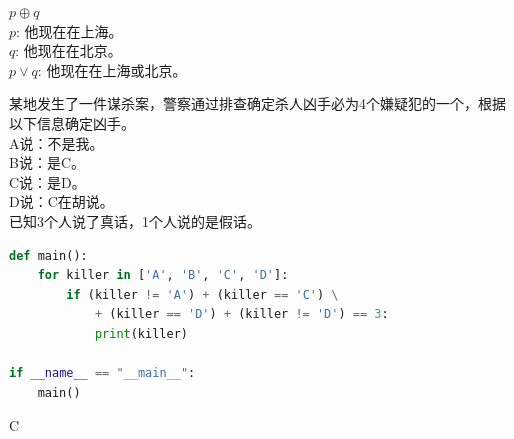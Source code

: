 \documentclass[12pt, openany, oneside]{book}
\begin{document}
\begin{table}[H]
	\centering
	\caption{XOR真值表}
\end{table}

\begin{tcolorbox}
	$ p \oplus q $ \\
	$ p $: 他现在在上海。 \\
	$ q $: 他现在在北京。 \\
	$ p \vee q $: 他现在在上海或北京。
\end{tcolorbox}

\begin{tcolorbox}
	某地发生了一件谋杀案，警察通过排查确定杀人凶手必为4个嫌疑犯的一个，根据以下信息确定凶手。 \\
	A说：不是我。 \\
	B说：是C。 \\
	C说：是D。 \\
	D说：C在胡说。 \\
	已知3个人说了真话，1个人说的是假话。
\end{tcolorbox}

\vspace{-0.5cm}
\begin{lstlisting}[language=Python]
def main():
    for killer in ['A', 'B', 'C', 'D']:
        if (killer != 'A') + (killer == 'C') \
            + (killer == 'D') + (killer != 'D') == 3:
            print(killer)

if __name__ == "__main__":
    main()
\end{lstlisting}

\begin{tcolorbox}
	C
\end{tcolorbox}

\newpage
\end{document}
